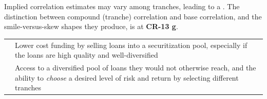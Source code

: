 \begin{crkeybox}
Implied correlation estimates may vary among tranches, leading to a
. The distinction between compound (tranche) correlation
and base correlation, and the smile-versus-skew shapes they produce, is at
\textbf{CR-13 g}.
\end{crkeybox}


\begin{center}
\footnotesize
\begin{tabular}{L{3.2cm} L{11.2cm}}
\toprule
{} &  \\
\midrule
{} & Lower cost funding by selling loans into a
  securitization pool, especially if the loans are high quality and
  well-diversified \\
 & Access to a diversified pool of loans they would not otherwise
  reach, and the ability to \emph{choose} a desired level of risk and return by
  selecting different tranches \\
\bottomrule
\end{tabular}
\end{center}
